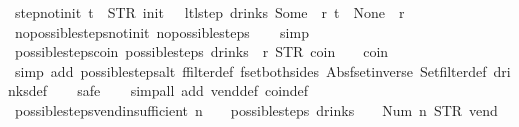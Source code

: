 \begin{isabellebody}
\endisatagproof
{\isafoldproof}%
%
\isadelimproof
\isanewline
%
\endisadelimproof
\isanewline
{}\isamarkupfalse%
\ step{\isacharunderscore}not{\isacharunderscore}init{\isacharcolon}\ {\isachardoublequoteopen}t\ {\isasymnoteq}\ {\isacharparenleft}STR\ {\isacharprime}{\isacharprime}init{\isacharprime}{\isacharprime}{\isacharcomma}\ {\isacharbrackleft}{\isacharbrackright}{\isacharparenright}\ {\isasymLongrightarrow}\ ltl{\isacharunderscore}step\ drinks\ {\isacharparenleft}Some\ {}{\isacharparenright}\ r\ t\ {\isacharequal}\ {\isacharparenleft}None{\isacharcomma}\ {\isacharbrackleft}{\isacharbrackright}{\isacharcomma}\ r{\isacharparenright}{\isachardoublequoteclose}\isanewline
%
\isadelimproof
\ \ %
\endisadelimproof
%
\isatagproof
{}\isamarkupfalse%
\ no{\isacharunderscore}possible{\isacharunderscore}steps{\isacharunderscore}not{\isacharunderscore}init\ no{\isacharunderscore}possible{\isacharunderscore}steps\isanewline
\ \ \isamarkupfalse%
\ simp%
\endisatagproof
{\isafoldproof}%
%
\isadelimproof
\isanewline
%
\endisadelimproof
\isanewline
{}\isamarkupfalse%
\ possible{\isacharunderscore}steps{\isacharunderscore}coin{\isacharcolon}\ {\isachardoublequoteopen}possible{\isacharunderscore}steps\ drinks\ {}\ r\ STR\ {\isacharprime}{\isacharprime}coin{\isacharprime}{\isacharprime}\ {\isacharbrackleft}{\isacharbrackright}\ {\isacharequal}\ {\isacharbraceleft}{\isacharbar}{\isacharparenleft}{}{\isacharcomma}\ coin{\isacharparenright}{\isacharbar}{\isacharbraceright}{\isachardoublequoteclose}\isanewline
%
\isadelimproof
\ \ %
\endisadelimproof
%
\isatagproof
{}\isamarkupfalse%
\ {\isacharparenleft}simp\ add{\isacharcolon}\ possible{\isacharunderscore}steps{\isacharunderscore}alt\ ffilter{\isacharunderscore}def\ fset{\isacharunderscore}both{\isacharunderscore}sides\ Abs{\isacharunderscore}fset{\isacharunderscore}inverse\ Set{\isachardot}filter{\isacharunderscore}def\ drinks{\isacharunderscore}def{\isacharparenright}\isanewline
\ \ \isamarkupfalse%
\ safe\isanewline
\ \ \isamarkupfalse%
\ {\isacharparenleft}simp{\isacharunderscore}all\ add{\isacharcolon}\ vend{\isacharunderscore}def\ coin{\isacharunderscore}def{\isacharparenright}%
\endisatagproof
{\isafoldproof}%
%
\isadelimproof
\isanewline
%
\endisadelimproof
\isanewline
{}\isamarkupfalse%
\ possible{\isacharunderscore}steps{\isacharunderscore}vend{\isacharunderscore}insufficient{\isacharcolon}\ {\isachardoublequoteopen}n\ {\isasymle}\ {}\ {\isasymLongrightarrow}\ possible{\isacharunderscore}steps\ drinks\ {}\ {\isacharparenleft}{\isacharless}{\isachargreater}{\isacharparenleft}{}\ {\isacharcolon}{\isacharequal}\ Num\ n{\isacharparenright}{\isacharparenright}\ STR\ {\isacharprime}{\isacharprime}vend{\isacharprime}{\isacharprime}\ {\isacharbrackleft}{\isacharbrackright}\ {\isacharequal}\ {\isacharbraceleft}{\isacharbar}{\isacharbar}{\isacharbraceright}{\isachardoublequoteclose}\isanewline

\end{isabellebody}
